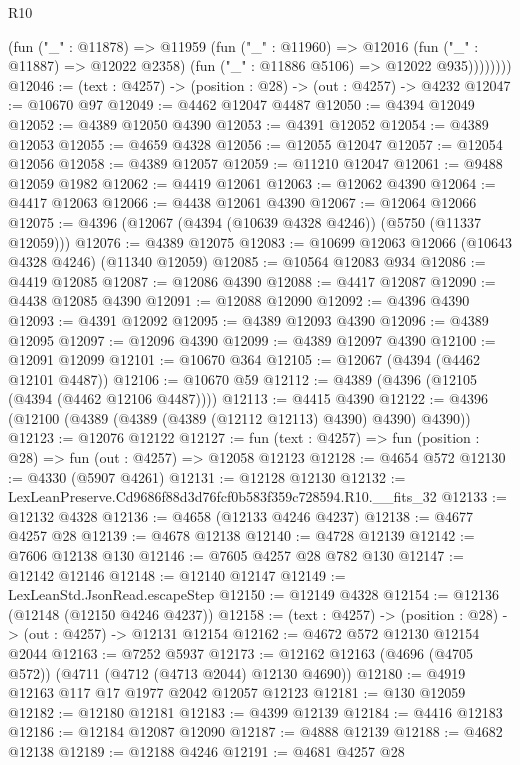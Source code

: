 \begin{lexlean}{R10}
\begin{coremodule}
              (fun ("_" : @11878) =>
              @11959
                (fun ("_" : @11960) =>
                @12016
                  (fun ("_" : @11887) => @12022 @2358)
                  (fun ("_" : @11886 @5106) => @12022 @935))))))))
@12046 := (text : @4257) -> (position : @28) -> (out : @4257) -> @4232
@12047 := @10670 @97
@12049 := @4462 @12047 @4487
@12050 := @4394 @12049
@12052 := @4389 @12050 @4390
@12053 := @4391 @12052
@12054 := @4389 @12053
@12055 := @4659 @4328
@12056 := @12055 @12047
@12057 := @12054 @12056
@12058 := @4389 @12057
@12059 := @11210 @12047
@12061 := @9488 @12059 @1982
@12062 := @4419 @12061
@12063 := @12062 @4390
@12064 := @4417 @12063
@12066 := @4438 @12061 @4390
@12067 := @12064 @12066
@12075 := @4396 (@12067 (@4394 (@10639 @4328 @4246)) (@5750 (@11337 @12059)))
@12076 := @4389 @12075
@12083 := @10699 @12063 @12066 (@10643 @4328 @4246) (@11340 @12059)
@12085 := @10564 @12083 @934
@12086 := @4419 @12085
@12087 := @12086 @4390
@12088 := @4417 @12087
@12090 := @4438 @12085 @4390
@12091 := @12088 @12090
@12092 := @4396 @4390
@12093 := @4391 @12092
@12095 := @4389 @12093 @4390
@12096 := @4389 @12095
@12097 := @12096 @4390
@12099 := @4389 @12097 @4390
@12100 := @12091 @12099
@12101 := @10670 @364
@12105 := @12067 (@4394 (@4462 @12101 @4487))
@12106 := @10670 @59
@12112 := @4389 (@4396 (@12105 (@4394 (@4462 @12106 @4487))))
@12113 := @4415 @4390
@12122 := @4396 (@12100 (@4389 (@4389 (@4389 (@12112 @12113) @4390) @4390) @4390))
@12123 := @12076 @12122
@12127 := fun (text : @4257) => fun (position : @28) => fun (out : @4257) => @12058 @12123
@12128 := @4654 @572
@12130 := @4330 (@5907 @4261)
@12131 := @12128 @12130
@12132 := LexLeanPreserve.Cd9686f88d3d76fcf0b583f359c728594.R10.__fits_32
@12133 := @12132 @4328
@12136 := @4658 (@12133 @4246 @4237)
@12138 := @4677 @4257 @28
@12139 := @4678 @12138
@12140 := @4728 @12139
@12142 := @7606 @12138 @130
@12146 := @7605 @4257 @28 @782 @130
@12147 := @12142 @12146
@12148 := @12140 @12147
@12149 := LexLeanStd.JsonRead.escapeStep
@12150 := @12149 @4328
@12154 := @12136 (@12148 (@12150 @4246 @4237))
@12158 := (text : @4257) -> (position : @28) -> (out : @4257) -> @12131 @12154
@12162 := @4672 @572 @12130 @12154 @2044
@12163 := @7252 @5937
@12173 := @12162 @12163 (@4696 (@4705 @572)) (@4711 (@4712 (@4713 @2044) @12130 @4690))
@12180 := @4919 @12163 @117 @17 @1977 @2042 @12057 @12123
@12181 := @130 @12059
@12182 := @12180 @12181
@12183 := @4399 @12139
@12184 := @4416 @12183
@12186 := @12184 @12087 @12090
@12187 := @4888 @12139
@12188 := @4682 @12138
@12189 := @12188 @4246
@12191 := @4681 @4257 @28

\end{coremodule}
\end{lexlean}
